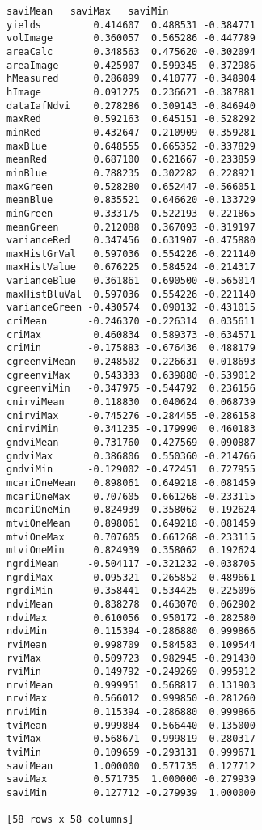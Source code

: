 \documentclass[11pt]{article}
\begin{document}
\begin{Verbatim}[commandchars=\\\{\}]
               saviMean   saviMax   saviMin
yields         0.414607  0.488531 -0.384771
volImage       0.360057  0.565286 -0.447789
areaCalc       0.348563  0.475620 -0.302094
areaImage      0.425907  0.599345 -0.372986
hMeasured      0.286899  0.410777 -0.348904
hImage         0.091275  0.236621 -0.387881
dataIafNdvi    0.278286  0.309143 -0.846940
maxRed         0.592163  0.645151 -0.528292
minRed         0.432647 -0.210909  0.359281
maxBlue        0.648555  0.665352 -0.337829
meanRed        0.687100  0.621667 -0.233859
minBlue        0.788235  0.302282  0.228921
maxGreen       0.528280  0.652447 -0.566051
meanBlue       0.835521  0.646620 -0.133729
minGreen      -0.333175 -0.522193  0.221865
meanGreen      0.212088  0.367093 -0.319197
varianceRed    0.347456  0.631907 -0.475880
maxHistGrVal   0.597036  0.554226 -0.221140
maxHistValue   0.676225  0.584524 -0.214317
varianceBlue   0.361861  0.690500 -0.565014
maxHistBluVal  0.597036  0.554226 -0.221140
varianceGreen -0.430574  0.090132 -0.431015
criMean       -0.246370 -0.226314  0.035611
criMax         0.460834  0.589373 -0.634571
criMin        -0.175883 -0.676436  0.488179
cgreenviMean  -0.248502 -0.226631 -0.018693
cgreenviMax    0.543333  0.639880 -0.539012
cgreenviMin   -0.347975 -0.544792  0.236156
cnirviMean     0.118830  0.040624  0.068739
cnirviMax     -0.745276 -0.284455 -0.286158
cnirviMin      0.341235 -0.179990  0.460183
gndviMean      0.731760  0.427569  0.090887
gndviMax       0.386806  0.550360 -0.214766
gndviMin      -0.129002 -0.472451  0.727955
mcariOneMean   0.898061  0.649218 -0.081459
mcariOneMax    0.707605  0.661268 -0.233115
mcariOneMin    0.824939  0.358062  0.192624
mtviOneMean    0.898061  0.649218 -0.081459
mtviOneMax     0.707605  0.661268 -0.233115
mtviOneMin     0.824939  0.358062  0.192624
ngrdiMean     -0.504117 -0.321232 -0.038705
ngrdiMax      -0.095321  0.265852 -0.489661
ngrdiMin      -0.358441 -0.534425  0.225096
ndviMean       0.838278  0.463070  0.062902
ndviMax        0.610056  0.950172 -0.282580
ndviMin        0.115394 -0.286880  0.999866
rviMean        0.998709  0.584583  0.109544
rviMax         0.509723  0.982945 -0.291430
rviMin         0.149792 -0.249269  0.995912
nrviMean       0.999951  0.568817  0.131903
nrviMax        0.566012  0.999850 -0.281260
nrviMin        0.115394 -0.286880  0.999866
tviMean        0.999884  0.566440  0.135000
tviMax         0.568671  0.999819 -0.280317
tviMin         0.109659 -0.293131  0.999671
saviMean       1.000000  0.571735  0.127712
saviMax        0.571735  1.000000 -0.279939
saviMin        0.127712 -0.279939  1.000000

[58 rows x 58 columns]
    \end{Verbatim}
\end{document}
